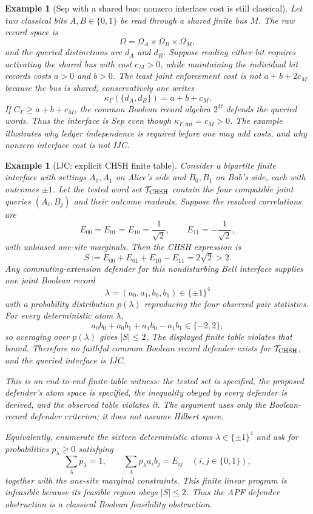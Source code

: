 \documentclass[11pt]{article}
\newtheorem{example}[theorem]{Example}
\begin{document}
\begin{example}[Sep with a shared bus: nonzero interface cost is still classical]\label{ex:classical-shared-bus}
Let two classical bits $A,B\in\{0,1\}$ be read through a shared finite bus $M$.  The raw record space is
\[
 \Omega=\Omega_A\times\Omega_B\times\Omega_M,
\]
and the queried distinctions are $d_A$ and $d_B$.  Suppose reading either bit requires activating the shared bus with cost $c_M>0$, while maintaining the individual bit records costs $a>0$ and $b>0$.  The least joint enforcement cost is not $a+b+2c_M$ because the bus is shared; conservatively one writes
\[
 \kappa_\Gamma(\{d_A,d_B\})=a+b+c_M.
\]
If $C_\Gamma\ge a+b+c_M$, the common Boolean record algebra $2^\Omega$ defends the queried words.  Thus the interface is Sep even though $\kappa_{\Gamma,\mathrm{int}}=c_M>0$.  The example illustrates why ledger independence is required before one may add costs, and why nonzero interface cost is not IJC.
\end{example}


\begin{example}[IJC: explicit CHSH finite table]\label{ex:chsh-finite-table}
Consider a bipartite finite interface with settings $A_0,A_1$ on Alice's side and $B_0,B_1$ on Bob's side, each with outcomes $\pm1$.  Let the tested word set $\mathcal T_{\rm CHSH}$ contain the four compatible joint queries $(A_i,B_j)$ and their outcome readouts.  Suppose the resolved correlations are
\[
  E_{00}=E_{01}=E_{10}=\frac{1}{\sqrt2},
  \qquad
  E_{11}=-\frac{1}{\sqrt2},
\]
with unbiased one-site marginals.  Then the CHSH expression is
\[
  S:=E_{00}+E_{01}+E_{10}-E_{11}=2\sqrt2>2.
\]
Any commuting-extension defender for this nondisturbing Bell interface supplies one joint Boolean record
\[
  \lambda=(a_0,a_1,b_0,b_1)\in\{\pm1\}^4
\]
with a probability distribution $p(\lambda)$ reproducing the four observed pair statistics.  For every deterministic atom $\lambda$,
\[
  a_0b_0+a_0b_1+a_1b_0-a_1b_1\in\{-2,2\},
\]
so averaging over $p(\lambda)$ gives $|S|\le2$.  The displayed finite table violates that bound.  Therefore no faithful common Boolean record defender exists for $\mathcal T_{\rm CHSH}$, and the queried interface is IJC.

This is an end-to-end finite-table witness: the tested set is specified, the proposed defender's atom space is specified, the inequality obeyed by every defender is derived, and the observed table violates it.  The argument uses only the Boolean-record defender criterion; it does not assume Hilbert space.

Equivalently, enumerate the sixteen deterministic atoms $\lambda\in\{\pm1\}^4$ and ask for probabilities $p_\lambda\ge0$ satisfying
\[
  \sum_\lambda p_\lambda=1,
  \qquad
  \sum_\lambda p_\lambda a_i b_j = E_{ij}
  \quad(i,j\in\{0,1\}),
\]
together with the one-site marginal constraints.  This finite linear program is infeasible because its feasible region obeys $|S|\le2$.  Thus the APF defender obstruction is a classical Boolean feasibility obstruction.
\end{example}
\end{document}
